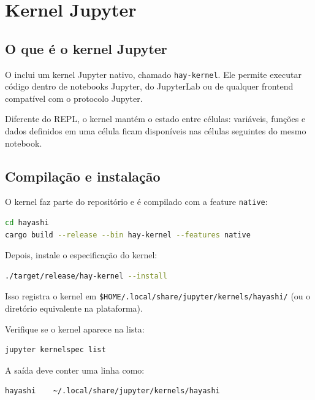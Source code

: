 \chapter{Kernel Jupyter}

\section{O que é o kernel Jupyter}

O \hayashi{} inclui um kernel Jupyter nativo, chamado \texttt{hay-kernel}. Ele
permite executar código \hayashi{} dentro de notebooks Jupyter, do JupyterLab ou
de qualquer frontend compatível com o protocolo Jupyter.

Diferente do REPL, o kernel mantém o estado entre células: variáveis, funções e
dados definidos em uma célula ficam disponíveis nas células seguintes do mesmo
notebook.

\section{Compilação e instalação}

O kernel faz parte do repositório \hayashi{} e é compilado com a feature
\texttt{native}:

\begin{lstlisting}[style=inline, language=sh]
cd hayashi
cargo build --release --bin hay-kernel --features native
\end{lstlisting}

Depois, instale o especificação do kernel:

\begin{lstlisting}[style=inline, language=sh]
./target/release/hay-kernel --install
\end{lstlisting}

Isso registra o kernel em \texttt{\$HOME/.local/share/jupyter/kernels/hayashi/}
(ou o diretório equivalente na plataforma).

Verifique se o kernel aparece na lista:

\begin{lstlisting}[style=inline, language=sh]
jupyter kernelspec list
\end{lstlisting}

A saída deve conter uma linha como:

\begin{lstlisting}[style=inline]
hayashi    ~/.local/share/jupyter/kernels/hayashi
\end{lstlisting}

